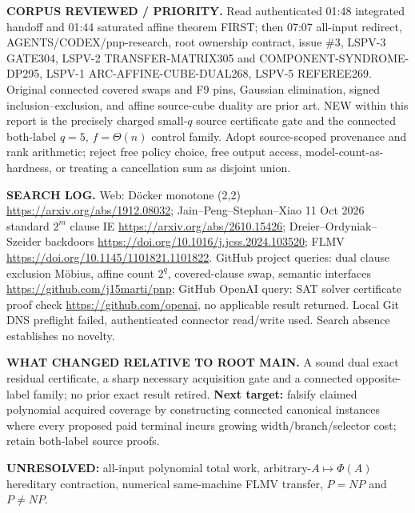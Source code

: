 \documentclass[11pt]{article}
\begin{document}
\noindent\textbf{CORPUS REVIEWED / PRIORITY.} Read authenticated 01:48 integrated handoff and 01:44 saturated affine theorem FIRST; then 07:07 all-input redirect, AGENTS/CODEX/pnp-research, root ownership contract, issue \#3, LSPV-3 GATE304, LSPV-2 TRANSFER-MATRIX305 and COMPONENT-SYNDROME-DP295, LSPV-1 ARC-AFFINE-CUBE-DUAL268, LSPV-5 REFEREE269. Original connected covered swaps and F9 pins, Gaussian elimination, signed inclusion--exclusion, and affine source-cube duality are prior art. NEW within this report is the precisely charged small-$q$ source certificate gate and the connected both-label $q=5$, $f=\Theta(n)$ control family. Adopt source-scoped provenance and rank arithmetic; reject free policy choice, free output access, model-count-as-hardness, or treating a cancellation sum as disjoint union.

\noindent\textbf{SEARCH LOG.} Web: D\"ocker monotone (2,2) \url{https://arxiv.org/abs/1912.08032}; Jain--Peng--Stephan--Xiao 11 Oct 2026 standard $2^m$ clause IE \url{https://arxiv.org/abs/2610.15426}; Dreier--Ordyniak--Szeider backdoors \url{https://doi.org/10.1016/j.jcss.2024.103520}; FLMV \url{https://doi.org/10.1145/1101821.1101822}. GitHub project queries: dual clause exclusion M\"obius, affine count $2^q$, covered-clause swap, semantic interfaces \url{https://github.com/j15marti/pnp}; GitHub OpenAI query: SAT solver certificate proof check \url{https://github.com/openai}, no applicable result returned. Local Git DNS preflight failed, authenticated connector read/write used. Search absence establishes no novelty.

\noindent\textbf{WHAT CHANGED RELATIVE TO ROOT MAIN.} A sound dual exact residual certificate, a sharp necessary acquisition gate and a connected opposite-label family; no prior exact result retired. \textbf{Next target:} falsify claimed polynomial acquired coverage by constructing connected canonical instances where every proposed paid terminal incurs growing width/branch/selector cost; retain both-label source proofs.
\par\noindent\textbf{UNRESOLVED:} all-input polynomial total work, arbitrary-$A\mapsto\Phi(A)$ hereditary contraction, numerical same-machine FLMV transfer, $P=NP$ and $P\ne NP$.
\end{document}

